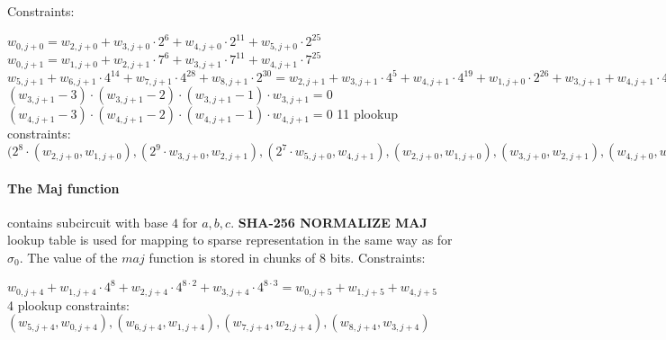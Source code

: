 Constraints:
\begin{center}
    $w_{0, j + 0} = w_{2, j + 0} + w_{3, j + 0} \cdot 2^{6} + w_{4, j + 0} \cdot 2^{11} + w_{5, j + 0} \cdot 2^{25}$ \\
    $w_{0, j + 1} = w_{1, j + 0} + w_{2, j + 1} \cdot 7^{6} + w_{3, j + 1} \cdot 7^{11} + w_{4, j + 1} \cdot 7^{25}$ \\
    $w_{5, j + 1} + w_{6, j + 1} \cdot 4^{14} + w_{7, j + 1} \cdot 4^{28} + w_{8, j + 1} \cdot 2^{30} = w_{2, j + 1} + w_{3, j + 1} \cdot 4^{5} + w_{4, j + 1} \cdot 4^{19} + w_{1, j + 0} \cdot 2^{26} + w_{3, j + 1} + w_{4, j + 1} \cdot 4^{14} + w_{1, j + 0} \cdot 4^{21} + w_{2, j + 1} \cdot 4^{27} + w_{4, j + 1} + w_{1, j + 0} \cdot 4^{7}+ w_{2, j + 1} \cdot 4^{13} + w_{3, j + 1} \cdot 4^{27}$ \\
    $(w_{3, j + 1} - 3) \cdot (w_{3, j + 1} - 2) \cdot (w_{3, j + 1} - 1) \cdot w_{3, j + 1} = 0$
    $(w_{4, j + 1} - 3) \cdot (w_{4, j + 1} - 2) \cdot (w_{4, j + 1} - 1) \cdot w_{4, j + 1} = 0$
    11 plookup constraints: $(2^8 \cdot (w_{2, j + 0}, w_{1, j + 0}), (2^9 \cdot w_{3, j + 0}, w_{2, j + 1}), (2^7 \cdot w_{5, j + 0}, w_{4, j + 1}), (w_{2,j + 0}, w_{1,j+0}), (w_{3, j + 0}, w_{2, j + 1}), (w_{4, j + 0}, w_{3, j + 1}), (w_{5, j + 0}, w_{4, j + 1}), (w_{5, j + 2}, w_{5, j + 1}), (w_{6, j + 2}, w_{6, j + 1}), (w_{7, j + 2}, w_{6, j + 1}), (w_{8, j + 2}, w_{7, j + 1})$ \\
\end{center}

\paragraph{The Maj function}
contains subcircuit with base $4$ for $a, b ,c$.
\textbf{SHA-256 NORMALIZE MAJ} lookup table is used for mapping to sparse representation in the same way as for $\sigma_0$.
The value of the $ maj $ function is stored in chunks of $8$ bits.
Constraints:
\begin{center}
    $w_{0, j + 4} + w_{1, j + 4} \cdot 4^8 + w_{2, j + 4} \cdot 4^{8 \cdot 2} + w_{3, j + 4} \cdot 4^{8 \cdot 3} = w_{0, j + 5} + w_{1, j + 5} + w_{4, j + 5} $ \\
    4 plookup constraints: $( w_{5, j + 4}, w_{0, j + 4}), ( w_{6, j + 4}, w_{1, j + 4}), (w_{7, j + 4}, w_{2, j + 4}), (w_{8, j + 4}, w_{3, j + 4})$ \\
\end{center}

